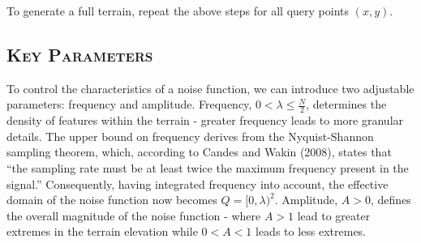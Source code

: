 To generate a full terrain, repeat the above steps for all query points $(x,y)$. 

\subsection{\textsc{Key Parameters}}
\vspace*{-10pt}

To control the characteristics of a noise function, we can introduce two adjustable parameters: frequency and 
amplitude. Frequency, $0<\lambda\le\frac{N}{2}$, determines the density of features within the terrain - greater 
frequency leads to more granular details. The upper bound on frequency derives from the Nyquist-Shannon sampling 
theorem, which, according to Candes and Wakin (2008), states that “the sampling rate must be at least twice the 
maximum frequency present in the signal.” Consequently, having integrated frequency into account, the effective 
domain of the noise function now becomes $Q=[0,\lambda)^2$. Amplitude, $A>0$, defines the overall magnitude of the
noise function - where $A>1$ lead to greater extremes in the terrain elevation while $0<A<1$ leads to less extremes.

